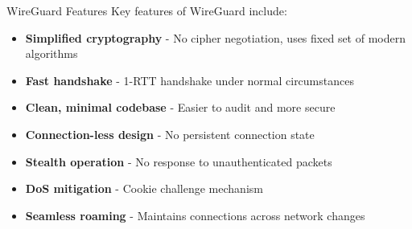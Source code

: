 \begin{theorem}{WireGuard Features}
Key features of WireGuard include:
\begin{itemize}
    \item \textbf{Simplified cryptography} - No cipher negotiation, uses fixed set of modern algorithms
    \item \textbf{Fast handshake} - 1-RTT handshake under normal circumstances
    \item \textbf{Clean, minimal codebase} - Easier to audit and more secure
    \item \textbf{Connection-less design} - No persistent connection state
    \item \textbf{Stealth operation} - No response to unauthenticated packets
    \item \textbf{DoS mitigation} - Cookie challenge mechanism
    \item \textbf{Seamless roaming} - Maintains connections across network changes
\end{itemize}
\end{theorem}

\multend


